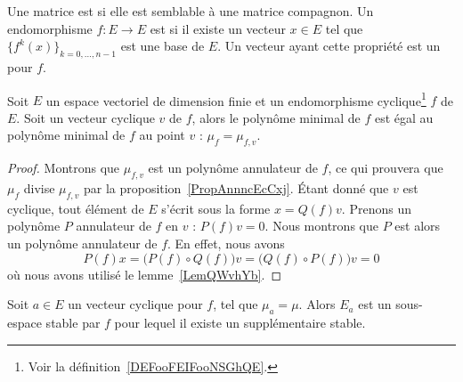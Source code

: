 \begin{definition}      \label{DEFooFEIFooNSGhQE}
	Une matrice est  si elle est semblable à une matrice compagnon. Un endomorphisme \( f\colon E\to E\) est  si il existe un vecteur \( x\in E\) tel que \( \{ f^k(x) \}_{k=0,\ldots, n-1} \) est une base de \( E\). Un vecteur ayant cette propriété est un  pour \( f\).
\end{definition}

\begin{lemma}   \label{LemAGZNNa}
	Soit \( E\) un espace vectoriel de dimension finie et un endomorphisme cyclique\footnote{Voir la définition~\ref{DEFooFEIFooNSGhQE}.} \( f\) de \( E\). Soit un vecteur cyclique \( v\) de \( f\), alors le polynôme minimal de \( f\) est égal au polynôme minimal de \( f\) au point \( v\) : \( \mu_{f}=\mu_{f,v}\).
\end{lemma}

\begin{proof}
	Montrons que \( \mu_{f,v}\) est un polynôme annulateur de \( f\), ce qui prouvera que \( \mu_f\) divise \( \mu_{f,v}\) par la proposition~\ref{PropAnnncEcCxj}. Étant donné que \( v\) est cyclique, tout élément de \( E\) s'écrit sous la forme \( x=Q(f)v\). Prenons un polynôme \( P\) annulateur de \( f\) en \( v\) : \( P(f)v=0\). Nous montrons que \( P\) est alors un polynôme annulateur de \( f\). En effet, nous avons
	\begin{equation}
		P(f)x=\big( P(f)\circ Q(f) \big)v=\big( Q(f)\circ P(f) \big)v=0
	\end{equation}
	où nous avons utilisé le lemme~\ref{LemQWvhYb}.
\end{proof}

\begin{lemma}        \label{LEMooOWDAooWPbPda}
	Soit \( a\in E\) un vecteur cyclique pour \( f\), tel que \( \mu_a=\mu\). Alors \( E_a\) est un sous-espace stable par \( f\) pour lequel il existe un supplémentaire stable.
\end{lemma}

